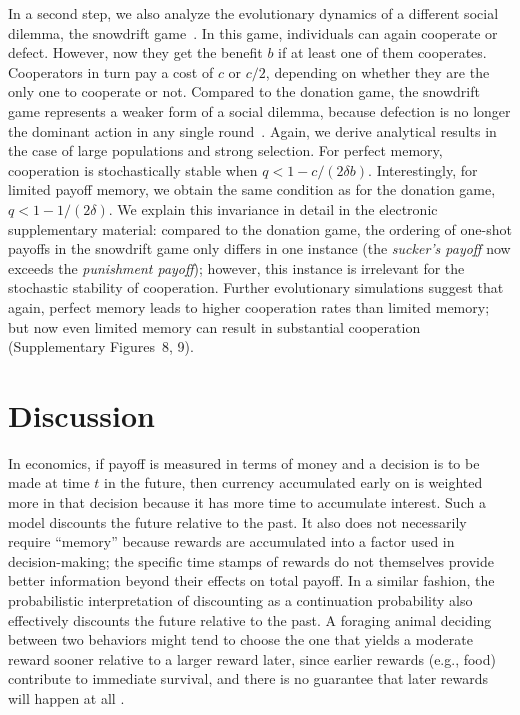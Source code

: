 \documentclass[11pt]{article}
\def\esm{electronic supplementary material}
\theoremstyle{plainCl1}
\theoremstyle{plainCl2}
\begin{document}
In a second step, we also analyze the evolutionary dynamics of a different social dilemma, the snowdrift game~\citep{doebeli:Ecology:2005}. 
In this game, individuals can again cooperate or defect. 
However, now they get the benefit $b$ if at least one of them cooperates. 
Cooperators in turn pay a cost of $c$ or $c/2$, depending on whether they are the only one to cooperate or not. 
Compared to the donation game, the snowdrift game represents a weaker form of a social dilemma, because defection is no longer the dominant action in any single round~\citep{nowak:JTB:2012}.
Again, we derive analytical results in the case of large populations and strong selection. 
For perfect memory, cooperation is stochastically stable when \(q < 1 \!-\! c/(2 \delta b)\). 
Interestingly, for limited payoff memory, we obtain the same condition as for the donation game, \(q < 1 \!-\! 1/(2 \delta)\). 
We explain this invariance in detail in the \esm{}: compared to the donation game, the ordering of one-shot payoffs in the snowdrift game only differs in one instance (the {\it sucker's payoff} now exceeds the {\it punishment payoff}); however, this instance is irrelevant for the stochastic stability of cooperation. 
Further evolutionary simulations suggest that again, perfect memory leads to higher cooperation rates than limited memory; but now even limited memory can result in substantial cooperation (Supplementary Figures~8, 9). 



\section{Discussion}\label{section:discussion}
%
In economics, if payoff is measured in terms of money and a decision is to be made at time $t$ in the future, then currency accumulated early on is weighted more in that decision because it has more time to accumulate interest. Such a model discounts the future relative to the past. It also does not necessarily require ``memory'' because rewards are accumulated into a factor used in decision-making; the specific time stamps of rewards do not themselves provide better information beyond their effects on total payoff. In a similar fashion, the probabilistic interpretation of discounting as a continuation probability \citep{axelrod1981evolution} also effectively discounts the future relative to the past. A foraging animal deciding between two behaviors might tend to choose the one that yields a moderate reward sooner relative to a larger reward later, since earlier rewards (e.g., food) contribute to immediate survival, and there is no guarantee that later rewards will happen at all \citep{stephens1986foraging}.
\end{document}

